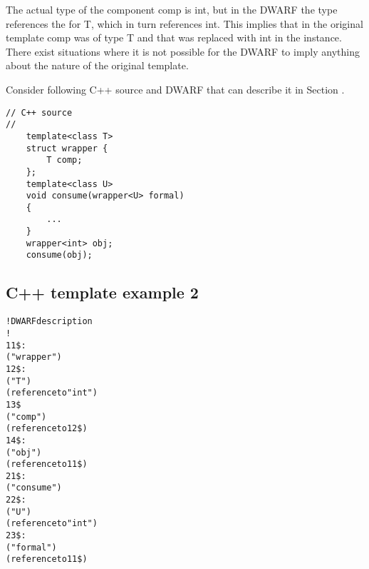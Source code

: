 The actual type of the component comp is int, but in the DWARF
the type references the  for
T, which in turn references int. This implies that in the
original template comp was of type T and that was replaced
with int in the instance.  There exist situations where it is
not possible for the DWARF to imply anything about the nature
of the original template. 

Consider following C++ source and DWARF 
that can describe it in
Section .


\begin{lstlisting}
// C++ source
//
    template<class T>
    struct wrapper {
        T comp;
    };
    template<class U>
    void consume(wrapper<U> formal)
    {
        ...
    }
    wrapper<int> obj;
    consume(obj);
\end{lstlisting}

\subsection{C++ template example 2}
\label{app:ctemplateexample2}
\begin{alltt}
! DWARF description
!
11\$: 
        ("wrapper")
12\$:   
            ("T")
            (reference to "int")
13\$    
            ("comp")
            (reference to 12\$)
14\$: 
        ("obj")
        (reference to 11\$)
21\$: 
        ("consume")
22\$:   
            ("U")
            (reference to "int")
23\$:   
            ("formal")
            (reference to 11\$)
\end{alltt}

